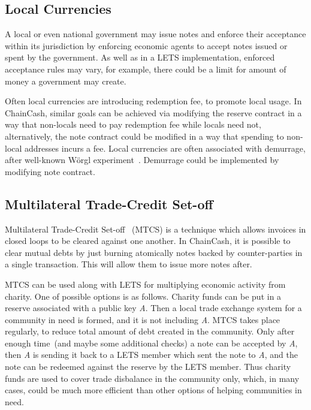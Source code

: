 \documentclass{ifcolog}
\newcommand{\cc}{ChainCash}
\begin{document}
\subsection{Local Currencies}

A local or even national government may issue notes and enforce their acceptance within its jurisdiction by enforcing economic agents to accept notes issued or spent by the government. As well as in a LETS implementation, enforced acceptance rules may vary, for example, there
could be a limit for amount of money a government may create.

Often local currencies are introducing redemption fee, to promote local usage. In \cc{}, similar goals can be achieved via modifying the reserve contract in a way that non-locals need to pay redemption fee while locals need not, alternatively, the note contract could be modified in a way that spending to non-local addresses incurs a fee. Local currencies are often associated with demurrage, after well-known W\"orgl experiment~\cite{unterguggenbercer1934end}. Demurrage could be implemented by modifying note contract.

\subsection{Multilateral Trade-Credit Set-off}
\label{mtcs}

Multilateral Trade-Credit Set-off~\cite{bottazzi2024multilateral} (MTCS) is a technique which allows invoices in closed loops to be cleared against one another.
In \cc{}, it is possible to clear mutual debts by just burning atomically notes backed by counter-parties in a single
transaction. This will allow them to issue more notes after.

MTCS can be used along with LETS for multiplying economic activity from charity. One of possible options is as follows.
Charity funds can be put in a reserve associated with a public key {\em A}. Then a local trade exchange system for a community
in need is formed, and it is not including {\em A}. MTCS takes place regularly, to reduce total amount of debt created in the
community. Only after enough time~(and maybe some additional checks) a note can be accepted by {\em A}, then {\em A} is sending it back to
a LETS member which sent the note to {\em A}, and the note can be redeemed against the reserve by the LETS member. Thus
charity funds are used to cover trade disbalance in the community only, which, in many cases, could be much more efficient
than other options of helping communities in need.
\end{document}
